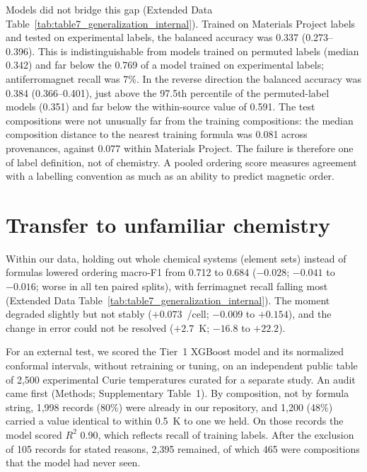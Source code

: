 \documentclass[11pt,a4paper]{article}
\begin{document}
Models did not bridge this gap (Extended Data Table~\ref{tab:table7_generalization_internal}). Trained on Materials Project labels and tested on experimental labels, the balanced accuracy was 0.337 (0.273--0.396). This is indistinguishable from models trained on permuted labels (median 0.342) and far below the 0.769 of a model trained on experimental labels; antiferromagnet recall was 7\%. In the reverse direction the balanced accuracy was 0.384 (0.366--0.401), just above the 97.5th percentile of the permuted-label models (0.351) and far below the within-source value of 0.591. The test compositions were not unusually far from the training compositions: the median composition distance to the nearest training formula was 0.081 across provenances, against 0.077 within Materials Project. The failure is therefore one of label definition, not of chemistry. A pooled ordering score measures agreement with a labelling convention as much as an ability to predict magnetic order.

\section*{Transfer to unfamiliar chemistry}\label{sec:rq3}

Within our data, holding out whole chemical systems (element sets) instead of formulas lowered ordering macro-F1 from 0.712 to 0.684 ($-0.028$; $-0.041$ to $-0.016$; worse in all ten paired splits), with ferrimagnet recall falling most (Extended Data Table~\ref{tab:table7_generalization_internal}). The moment degraded slightly but not stably ($+0.073$~\muB{}/cell; $-0.009$ to $+0.154$), and the change in \Tc{} error could not be resolved ($+2.7$~K; $-16.8$ to $+22.2$).

For an external test, we scored the Tier~1 XGBoost \Tc{} model and its normalized conformal intervals, without retraining or tuning, on an independent public table of 2,500 experimental Curie temperatures curated for a separate study\cite{malaei_magnetic_data,abediorang2026curie}. An audit came first (Methods; Supplementary Table~1). By composition, not by formula string, 1,998 records (80\%) were already in our repository, and 1,200 (48\%) carried a value identical to within 0.5~K to one we held. On those records the model scored $R^2$ 0.90, which reflects recall of training labels. After the exclusion of 105 records for stated reasons, 2,395 remained, of which 465 were compositions that the model had never seen.
\end{document}
